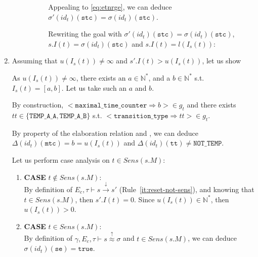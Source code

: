 \documentclass[dvipsnames,12pt]{article}
\begin{document}
\begin{niproof}
\begin{enumerate}
\begin{enumerate}
\begin{enumerate}
\begin{enumerate}
          Appealing to \eqref{eq:etnrge}, we can deduce
          $\sigma'(id_t)(\texttt{stc})=\sigma(id_t)(\texttt{stc})$.

          Rewriting the goal with
          $\sigma'(id_t)(\texttt{stc})=\sigma(id_t)(\texttt{stc})$,
          $s.I(t)=\sigma(id_t)(\texttt{stc})$ and $s.I(t)=l(I_s(t))$:
        \end{enumerate}
      \end{enumerate}
    \end{enumerate}
  \item

    Assuming that $u(I_s(t))\neq\infty$ and
    $s'.I(t)>{}u(I_s(t))$, let us show \\

    As $u(I_s(t))\neq\infty$, there exists an
    $a\in\mathbb{N}^{*}$, and a $b\in\mathbb{N}^{*}$
    s.t. $I_s(t)=[a,b]$. Let us take such an $a$ and $b$.

    By construction,
    ${<}\mathtt{maximal\_time\_counter\Rightarrow}b{>}\in{}g_t$ and
    there exists \\$tt\in\{\mathtt{TEMP\_A\_A,TEMP\_A\_B\}}$ s.t.
    ${<}\mathtt{transition\_type\Rightarrow}tt{>}\in{}g_t$.

    By property of the elaboration relation and \InCsCompT, we can
    deduce $\Delta(id_t)(\texttt{mtc})=b=u(I_s(t))$ and
    $\Delta(id_t)(\texttt{tt})\neq\mathtt{NOT\_TEMP}$.

    Let us perform case analysis on $t\in{}Sens(s.M)$:
      \begin{enumerate}
      \item \textbf{CASE} $t\notin{}Sens(s.M)$:\\
        By definition of $E_c,\tau\vdash{}s\xrightarrow{\downarrow}s'$
        (Rule~\ref{it:reset-not-sens}), and knowing that
        $t\in{}Sens(s.M)$, then $s'.I(t)=0$. Since
        $u(I_s(t))\in\mathbb{N}^{*}$, then $u(I_s(t))>0$.
        
        
      \item \textbf{CASE} $t\in{}Sens(s.M)$:\\
        By definition of
        $\gamma,E_c,\tau\vdash{}s\stackrel{\uparrow}{\approx}\sigma$
        and $t\in{}Sens(s.M)$, we can deduce
        $\sigma(id_t)(\texttt{se})=\mathtt{true}$.


\end{enumerate}
\end{enumerate}
\end{niproof}
\end{document}
